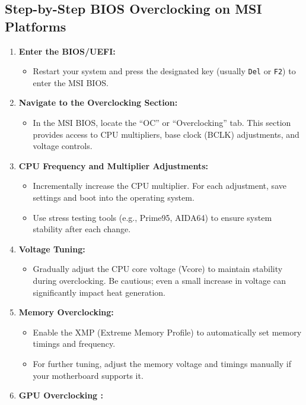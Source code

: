 \documentclass{article}
\begin{document}
\subsection{Step-by-Step BIOS Overclocking on MSI Platforms}
\begin{enumerate}[itemsep=5pt]
    \item \textbf{Enter the BIOS/UEFI:}
    \begin{itemize}[label=--]
        \item Restart your system and press the designated key (usually \texttt{Del} or \texttt{F2}) to enter the MSI BIOS.
    \end{itemize}
    \item \textbf{Navigate to the Overclocking Section:}
    \begin{itemize}[label=--]
        \item In the MSI BIOS, locate the “OC” or “Overclocking” tab. This section provides access to CPU multipliers, base clock (BCLK) adjustments, and voltage controls.
    \end{itemize}
    \item \textbf{CPU Frequency and Multiplier Adjustments:}
    \begin{itemize}[label=--]
        \item Incrementally increase the CPU multiplier. For each adjustment, save settings and boot into the operating system.
        \item Use stress testing tools (e.g., Prime95, AIDA64) to ensure system stability after each change.
    \end{itemize}
    \item \textbf{Voltage Tuning:}
    \begin{itemize}[label=--]
        \item Gradually adjust the CPU core voltage (Vcore) to maintain stability during overclocking. Be cautious; even a small increase in voltage can significantly impact heat generation.
    \end{itemize}
    \item \textbf{Memory Overclocking:}
    \begin{itemize}[label=--]
        \item Enable the XMP (Extreme Memory Profile) to automatically set memory timings and frequency.
        \item For further tuning, adjust the memory voltage and timings manually if your motherboard supports it.
    \end{itemize}
    \item \textbf{GPU Overclocking :}

\end{enumerate}
\end{document}
